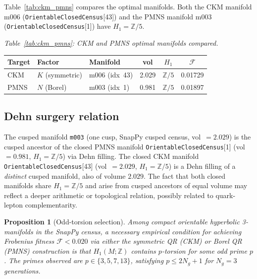 \documentclass[11pt,a4paper]{article}
\newtheorem{proposition}{Proposition}
\begin{document}
Table~\ref{tab:ckm_pmns} compares the optimal manifolds.
Both the CKM manifold m006 (\texttt{OrientableClosedCensus}[43])
and the PMNS manifold m003 (\texttt{OrientableClosedCensus}[1])
have $H_1 = \mathbb{Z}/5$.


\begin{center}
\textit{Table~\ref{tab:ckm_pmns}: CKM and PMNS optimal manifolds compared.}\label{tab:ckm_pmns}\\
\smallskip
\begin{tabular}{lllccc}
\toprule
Target & Factor & Manifold & vol & $H_1$ & $\mathcal{F}$ \\
\midrule
CKM  & $K$ (symmetric) & m006 (idx~43) & 2.029 & $\mathbb{Z}/5$ & 0.01729 \\
PMNS & $N$ (Borel)     & m003 (idx~1)  & 0.981 & $\mathbb{Z}/5$ & 0.01897 \\
\bottomrule
\end{tabular}
\end{center}


\subsection{Dehn surgery relation}

The cusped manifold \texttt{m003} (one cusp, SnapPy cusped census,
vol~$= 2.029$) is the cusped ancestor of the closed PMNS manifold
\texttt{OrientableClosedCensus}[1] (vol~$= 0.981$, $H_1 = \mathbb{Z}/5$)
via Dehn filling.
The closed CKM manifold \texttt{OrientableClosedCensus}[43]
(vol~$= 2.029$, $H_1 = \mathbb{Z}/5$) is a Dehn filling of a
\emph{distinct} cusped manifold, also of volume $2.029$.
The fact that both closed manifolds share $H_1 = \mathbb{Z}/5$ and
arise from cusped ancestors of equal volume may reflect a deeper
arithmetic or topological relation, possibly related to
quark-lepton complementarity.

\begin{proposition}[Odd-torsion selection]
\label{prop:oddtorsion}
Among compact orientable hyperbolic 3-manifolds in the SnapPy census,
a necessary empirical condition for achieving Frobenius fitness
$\mathcal{F} < 0.020$ via either the symmetric QR \emph{(CKM)} or
Borel QR \emph{(PMNS)} construction is that $H_1(M;\mathbb{Z})$
contains $p$-torsion for some odd prime $p$.
The primes observed are $p \in \{3, 5, 7, 13\}$, satisfying
$p \leq 2N_g + 1$ for $N_g = 3$ generations.
\end{proposition}

\end{document}
